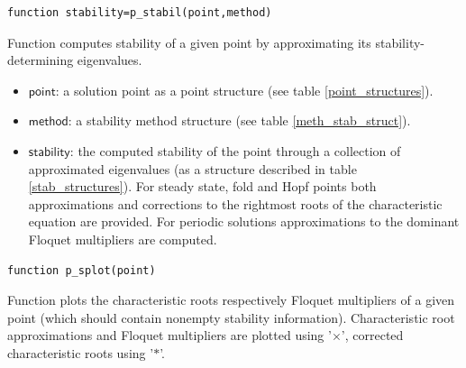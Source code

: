 \documentclass[10pt]{article}
\gdef \file#1{{\bfseries{\ttfamily{#1}}}}
\gdef \parm#1{{\mathsf{#1}}}
\begin{document}
{{\small\begin{verbatim}
function stability=p_stabil(point,method)
\end{verbatim}}
\noindent Function \file{p\_stabil} computes stability of a given point
by approximating its stability-determining eigenvalues.
\begin{itemize}
\item $\parm{point}$: a solution point as a point 
structure (see table \ref{point_structures}).
\item $\parm{method}$: a stability method structure 
(see table \ref{meth_stab_struct}).
\item $\parm{stability}$: the computed stability of the point
through a collection of approximated eigenvalues 
(as a structure described in table \ref{stab_structures}).
For steady state, fold and Hopf points both
approximations and corrections to the 
rightmost roots of the characteristic equation are provided.
For periodic
solutions approximations to the dominant Floquet multipliers are computed.
\end{itemize}

{\small\begin{verbatim}
function p_splot(point)
\end{verbatim}}
\noindent Function \file{p\_splot} plots the characteristic roots respectively
Floquet multipliers of a given point 
(which should contain nonempty stability information).
Characteristic root approximations and Floquet
multipliers are plotted using '$\times$',
corrected characteristic roots using '$*$'.

}
\end{document}
